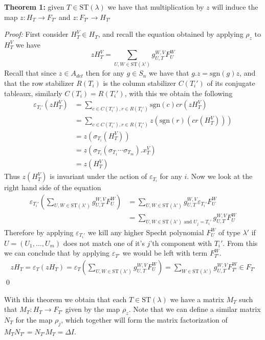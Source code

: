 \documentclass[../MT.tex]{subfiles}
\begin{document}
\textbf{Theorem 1:} given $ T \in \text{ST}(\lambda) $ we have that multiplication by $ z $ will induce the map $ z:H_T \to F_{T'} $ and $ z:F_{T'} \to H_{T'} $

\textit{Proof:} First consider $ H_T^V \in H_T $, and recall the equation obtained by applying $ \rho_z $ to $ H_T^V $ we have
\[ zH_T^V = \sum\limits_{U,W \in \text{ST}(\lambda')}g_{U,T}^{W,V} F_U^W \]
Recall that since $ z \in A_{det} $ then for any $ g \in S_n $ we have that $ g.z = \text{sgn}(g)z $, and that the row stabilizer $ R(T_i) $ is the column stabilizer $ C(T_i') $ of its conjugate tableaux, similarly $ C(T_i) = R(T_i') $, with this we obtain the following
\begin{align*}
	\varepsilon_{T_i'}(zH_T^V) 
	&= \sum\limits_{c\in C(T_i'), r \in R(T_i')} \text{sgn}(c)cr(zH_T^V) \\
	&= \sum\limits_{c\in C(T_i'), r \in R(T_i')} z(\text{sgn}(r)(cr(H_T^V)))\\
	&= z(\sigma_{T_i}(H_T^V)) \\
	&= z(\sigma_{T_i} (\sigma_{T_1}\cdots \sigma_{T_m}).x_T^V ) \\
	&= z(H_T^V) 
\end{align*}
Thus $ z(H_T^V) $ is invariant under the action of $ \varepsilon_{T_i} $ for any $ i $. Now we look at the right hand side of the equation 
\begin{align*}
	\varepsilon_{T_i'}(\sum\limits_{U,W \in \text{ST}(\lambda')}g_{U,T}^{W,V} F_U^W) &= \sum\limits_{U,W \in \text{ST}(\lambda')}g_{U,T}^{W,V}\varepsilon_{T_i'} F_U^W\\
	&= \sum\limits_{U,W \in \text{ST}(\lambda') \text{ and } U_j = T_i'}g_{U,T}^{W,V} F_U^W
\end{align*}
Therefore by applying $ \varepsilon_{T_i'} $ we kill any higher Specht polynomial $ F_U^W $ of type $ \lambda' $ if $ U = (U_1,\hdots,U_m) $ does not match one of it's $ j $'th component with $ T_i' $. From this we can conclude that by
applying $ \varepsilon_{T'} $ we would be left with term $ F_{T'}^W $.
\begin{align*}
zH_T = \varepsilon_T(zH_T) = \varepsilon_T(\sum\limits_{U,W \in \text{ST}(\lambda')}g_{U,T}^{W,V} F_U^W) = \sum\limits_{W \in \text{ST}(\lambda')}g_{U,T}^{W,V} F_{T'}^W \in F_{T'}
\end{align*}
\qed

With this theorem we obtain that each $ T \in \text{ST}(\lambda) $ we have a matrix $ M_T $ such that $ M_T:H_T \to F_{T'} $ given by the map $ \rho_z $. Note that we can define a similar matrix $ N_T $ for the map $ \rho_j $, which together will form the matrix factorization of $ M_TN_{T'} = N_{T'}M_T = \Delta I $.
\end{document}
